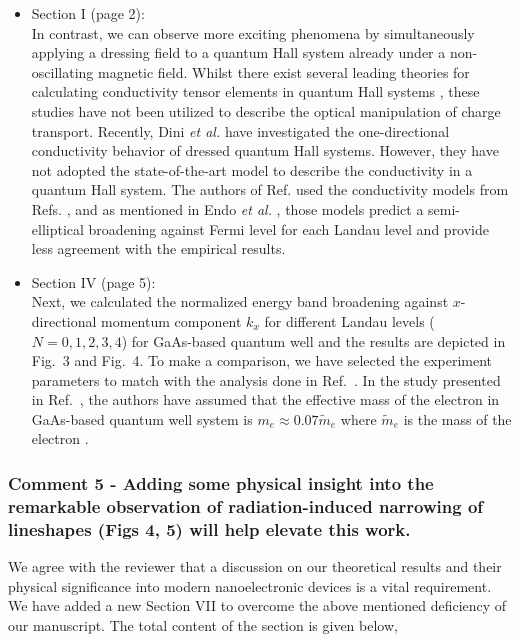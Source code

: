 \documentclass{article}
\begin{document}
\begin{itemize}
{  }
  \item Section I (page 2):\\
  {\color{Maroon}
  In contrast, we can observe more exciting phenomena by simultaneously applying a dressing field to a quantum Hall system already under a non-oscillating magnetic field.
  Whilst there exist several leading theories for calculating conductivity tensor elements in quantum Hall systems \cite{ando74_1,ando82,endo09}, these studies  have not been utilized to describe the optical manipulation of charge transport.
  Recently, Dini \textit{et al.} \cite{dini16} have investigated the one-directional conductivity behavior of dressed quantum Hall systems. However, they have not adopted the state-of-the-art model to describe the conductivity in a quantum Hall system. The authors of Ref.\cite{dini16} used the conductivity models from Refs. \cite{ando74_1,ando82}, and as mentioned in Endo \textit{et al.} \cite{endo09}, those models predict a semi-elliptical broadening against Fermi level for each Landau level and provide less agreement with the empirical results.
  }
  \item Section IV (page 5):\\
  {\color{Maroon}
  Next, we calculated the normalized energy band broadening against $x$-directional momentum component ${k_x}$ for different Landau levels ($N = 0,1,2,3,4$) for GaAs-based quantum well and the results are depicted in Fig.~3 and Fig.~4. To make a comparison, we have selected the experiment parameters to match with the analysis done in Ref.~\cite{endo09}.
  In the study presented in Ref.~\cite{endo09}, the authors have assumed that the effective mass of the electron in GaAs-based quantum well system is $m_e \approx 0.07\widetilde{m}_e$ where $\widetilde{m}_e$ is the mass of the electron \cite{endo09,winkler03,wackerl20}.
  }
\end{itemize}

\subsubsection*{Comment 5 -
\color{RoyalBlue} Adding some physical insight into the remarkable observation of radiation-induced narrowing of lineshapes (Figs 4, 5) will help elevate
this work.
}

We agree with the reviewer that a discussion on our theoretical results and their physical significance into modern nanoelectronic devices is a vital requirement. We have added a new Section VII to overcome the above mentioned deficiency of our manuscript. The total content of the section is given below,
\end{document}
